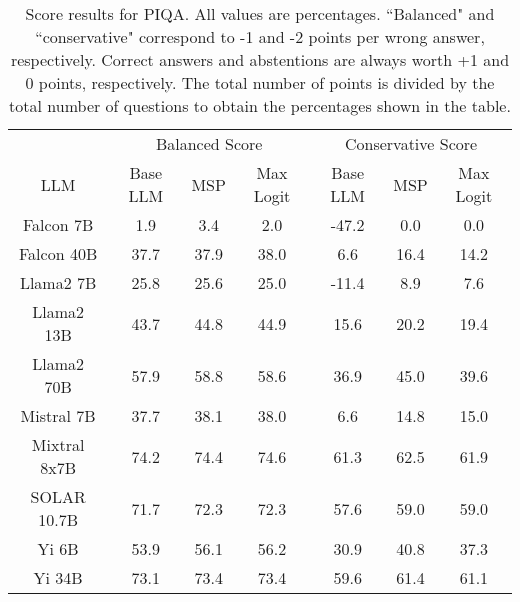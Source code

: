 \begin{table*}
\centering
\begin{tabular}{c|c|c|c|c|c|c}
& \multicolumn{3}{c|}{Balanced Score} & \multicolumn{3}{c}{Conservative Score} \\ 
LLM & Base LLM & MSP & Max Logit & Base LLM & MSP & Max Logit\\ \hline
Falcon 7B & 1.9 & 3.4 & 2.0 & -47.2 & 0.0 & 0.0\\
Falcon 40B & 37.7 & 37.9 & 38.0 & 6.6 & 16.4 & 14.2\\
Llama2 7B & 25.8 & 25.6 & 25.0 & -11.4 & 8.9 & 7.6\\
Llama2 13B & 43.7 & 44.8 & 44.9 & 15.6 & 20.2 & 19.4\\
Llama2 70B & 57.9 & 58.8 & 58.6 & 36.9 & 45.0 & 39.6\\
Mistral 7B & 37.7 & 38.1 & 38.0 & 6.6 & 14.8 & 15.0\\
Mixtral 8x7B & 74.2 & 74.4 & 74.6 & 61.3 & 62.5 & 61.9\\
SOLAR 10.7B & 71.7 & 72.3 & 72.3 & 57.6 & 59.0 & 59.0\\
Yi 6B & 53.9 & 56.1 & 56.2 & 30.9 & 40.8 & 37.3\\
Yi 34B & 73.1 & 73.4 & 73.4 & 59.6 & 61.4 & 61.1\\
\hline
\end{tabular}
\caption{Score results for PIQA. All values are percentages. ``Balanced" and ``conservative" correspond to -1 and -2 points per wrong answer, respectively. Correct answers and abstentions are always worth +1 and 0 points, respectively. The total number of points is divided by the total number of questions to obtain the percentages shown in the table.}
\label{tab:piqa_score}
\end{table*}
